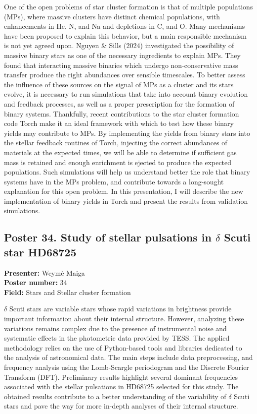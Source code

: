 One of the open problems of star cluster formation is that of multiple populations (MPs), where massive clusters have distinct chemical populations, with enhancements in He, N, and Na and depletions in C, and O. Many mechanisms have been proposed to explain this behavior, but a main responsible mechanism is not yet agreed upon. Nguyen \& Sills (2024) investigated the possibility of massive binary stars as one of the necessary ingredients to explain MPs. They found that interacting massive binaries which undergo non-conservative mass transfer produce the right abundances over sensible timescales. To better assess the influence of these sources on the signal of MPs as a cluster and its stars evolve, it is necessary to run simulations that take into account binary evolution and feedback processes, as well as a proper prescription for the formation of binary systems. Thankfully, recent contributions to the star cluster formation code Torch make it an ideal framework with which to test how these binary yields may contribute to MPs. By implementing the yields from binary stars into the stellar feedback routines of Torch, injecting the correct abundances of materials at the expected times, we will be able to determine if sufficient gas mass is retained and enough enrichment is ejected to produce the expected populations. Such simulations will help us understand better the role that binary systems have in the MPs problem, and contribute towards a long-sought explanation for this open problem. In this presentation, I will describe the new implementation of binary yields in Torch and present the results from validation simulations.

\hypertarget{poster-abstract-talk-60}{}\label{poster-abstract-page-talk-60}
\subsection*{Poster 34. Study of stellar pulsations in $\delta$ Scuti star HD68725}
\textbf{Presenter:} Weymè Maiga\\
\textbf{Poster number:} 34\\
\textbf{Field:} Stars and Stellar cluster formation

$\delta$ Scuti stars are variable stars whose rapid variations in brightness provide important information about their internal structure. However, analyzing these variations remains complex due to the presence of instrumental noise and systematic effects in the photometric data provided by TESS. The applied methodology relies on the use of Python-based tools and libraries dedicated to the analysis of astronomical data. The main steps include data preprocessing, and frequency analysis using the Lomb-Scargle periodogram and the Discrete Fourier Transform (DFT). Preliminary results highlight several dominant frequencies associated with the stellar pulsations in HD68725 selected for this study. The obtained results contribute to a better understanding of the variability of $\delta$ Scuti stars and pave the way for more in-depth analyses of their internal structure.

